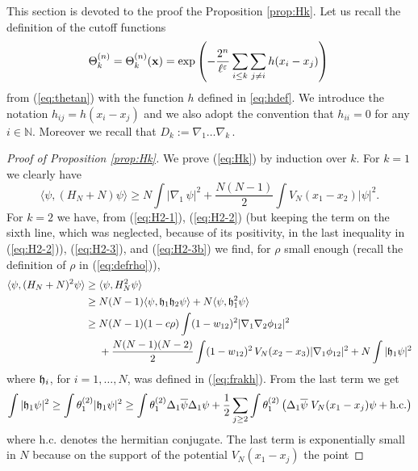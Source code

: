 \documentclass[11pt]{article}
\newcommand{\eps}{\varepsilon}
\newcommand{\bx}{{\bf x}}
\newcommand{\bN}{{\mathbb N}}
\newcommand{\fh}{{\frak h}}
\begin{document}
This section is devoted to the proof the Proposition \ref{prop:Hk}.
Let us recall the definition of the cutoff functions
\[ \Theta^{(n)}_k=\Theta^{(n)}_k (\bx) =\exp \left( -\frac{2^n}{\ell^{\eps}}
\sum_{i\leq k}\sum_{j \neq i} h (x_i -x_j) \right) \, \] from
(\ref{eq:thetan}) with the function $h$ defined in \eqref{eq:hdef}.
We introduce the notation $h_{ij} = h (x_i -x_j)$ and we also adopt
the convention that $h_{ii} =0$ for any $i \in \bN$. Moreover we
recall that $D_k := \nabla_1 \dots \nabla_k \,.$

\begin{proof}[Proof of Proposition \ref{prop:Hk}]
We prove (\ref{eq:Hk}) by induction over $k$. For $k=1$ we clearly
have
\begin{equation}\label{eq:k=1}
\langle \psi, (H_N +N) \psi \rangle \geq N \int |\nabla_1 \, \psi|^2
+ \frac{N(N-1)}{2} \int V_{N} (x_1 -x_2) |\psi|^2.
\end{equation}
For $k=2$ we have, from (\ref{eq:H2-1}), (\ref{eq:H2-2}) (but
keeping  the term on the sixth line, which was neglected, because of
its positivity, in the last inequality in (\ref{eq:H2-2})),
(\ref{eq:H2-3}), and (\ref{eq:H2-3b}) we find,  for $\rho$ small
enough (recall the definition of $\rho$ in (\ref{eq:defrho})),
\begin{equation}\label{eq:Hk-k=2}
\begin{split}
\langle \psi, (H_N+N)^2 \psi \rangle \geq \; & \langle \psi, H_N^2
\psi \rangle \\ \geq \; &N (N-1) \langle \psi, \fh_1 \fh_2 \psi
\rangle + N \langle \psi, \fh_1^2 \psi \rangle \\ \geq \;& N(N-1)
(1-c\rho) \int (1-w_{12})^2 |\nabla_1 \nabla_2 \phi_{12}|^2 \\ &+
\frac{N(N-1)(N-2)}{2} \int (1-w_{12})^2 \, V_N (x_2-x_3) |\nabla_1
\phi_{12}|^2 + N \int |\fh_1 \psi|^2
\end{split}
\end{equation}
where $\fh_i$, for $i=1, \dots,N$, was defined in (\ref{eq:frakh}).
{F}rom the last term we get
\begin{equation}
\int |\fh_1 \psi|^2 \geq \int \theta_1^{(2)} |\fh_1 \psi|^2 \geq
\int \theta_1^{(2)} \Delta_1 \overline{\psi} \Delta_1 \psi +
\frac{1}{2} \sum_{j \geq 2} \int \theta_1^{(2)} \left( \Delta_1
\overline{\psi} \; V_N(x_1 -x_j) \psi + \text{h.c.} \right)
\end{equation}
where h.c. denotes the hermitian conjugate. The last term is
exponentially small in $N$ because on the support
of the potential $V_N (x_1 -x_j)$ the point

\end{proof}
\end{document}
